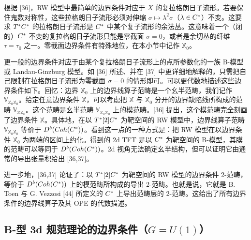 根据 [36]，RW 模型中最简单的边界条件对应于 $X$ 的复拉格朗日子流形。若要保住鬼数对称性，这些拉格朗日子流形必须对伸缩 $\sigma\mapsto\lambda^2\sigma$（$\lambda\in C^*$）不变。这要求 $T^*C^*$ 的拉格朗日子流形是 $C^*$ 中某个复子流形的余法丛。这意味着一个（闭的）$C^*$-不变的复拉格朗日子流形只能是零截面 $\sigma=0$，或者是余切丛的纤维 $\tau=\tau_0$ 之一。零截面边界条件有特殊地位，在本小节中记作 $\mathbb{X}_0$。


更一般的边界条件对应于由某个复拉格朗日子流形上的点所参数化的一族 B-模型或 Landau-Ginzburg 模型。如 [36] 所述、并在 [37] 中更详细地解释的，只需把自己限制在拉格朗日子流形为零截面 $\sigma=0$ 的情形即可。可以更代数地描述这些边界条件如下。回忆：边界 $\mathbb{X}_0$ 上的边界线算子范畴是一个幺半范畴，我们记作 $\mathbb{V}_{\mathbb{X}_0\mathbb{X}_0}$。给定任意边界条件 $\mathbb{X}$，可以考虑把 $\mathbb{X}$ 与 $\mathbb{X}_0$ 分开的边界缺陷线所构成的范畴 $\mathbb{V}_{\mathbb{X}\mathbb{X}_0}$。这个范畴是幺半范畴 $\mathbb{V}_{\mathbb{X}_0\mathbb{X}_0}$ 上的模范畴。[36] 提出，这个模范畴完全刻画了边界条件 $\mathbb{X}$。具体地，在以 $T^*[2]C^*$ 为靶空间的 RW 模型中，边界线算子范畴 $\mathbb{V}_{\mathbb{X}_0\mathbb{X}_0}$ 等价于 $D^b(Coh(C^*))$。看到这一点的一种方式是：把 RW 模型在以边界条件 $\mathbb{X}_0$ 为两端的区间上约化。得到的 2d TFT 是以 $C^*$ 为靶空间的 B-模型，其膜的范畴可以等同于 $D^b(Coh(C^*))$。2d 视角无法确定幺半结构，但可以证明它由通常的导出张量积给出 [36,37]。

进一步地，[36,37] 论证了：以 $T^*[2]C^*$ 为靶空间的 RW 模型的边界条件 2-范畴，等价于 $D^b(Coh(C^*))$ 上的模范畴所构成的导出 2-范畴。也就是说，它就是 B. Toen 与 G. Vezzosi [44] 所定义的 $C^*$ 上导出范畴层的 2-范畴。这给出了所有边界条件的边界线算子及其 OPE 的代数描述。


\subsection{\texorpdfstring{B-型 3d 规范理论的边界条件（$G=U(1)$）}{B-型 3d 规范理论的边界条件（G=U(1)）}}

